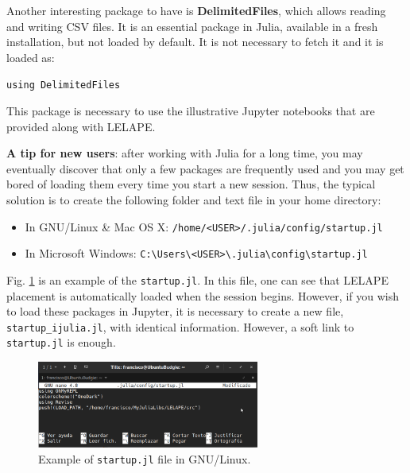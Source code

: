 Another interesting package to have is \textbf{DelimitedFiles}, which allows reading and writing CSV files. It is an essential package in Julia, available in a fresh installation, but not loaded by default. It is not necessary to fetch it and it is loaded as:
	
\vspace{1mm}
\begin{center}
	\texttt{using DelimitedFiles}
\end{center}
\vspace{1mm}	

This package is necessary to use the illustrative Jupyter notebooks that are provided along with LELAPE.

\textbf{A tip for new users}: after working with Julia for a long time, you may eventually discover that only a few packages are frequently used and  you may get bored of loading them every time you start a new session. Thus, the typical solution is to create the following folder and text file in your home directory:
%
\begin{itemize}
	\item In GNU/Linux \& Mac OS X: \texttt{/home/<USER>/.julia/config/startup.jl}
	\item In Microsoft Windows: \texttt{C:{\textbackslash}Users{\textbackslash}<USER>{\textbackslash}.julia{\textbackslash}config{\textbackslash}startup.jl}
\end{itemize}  
%
Fig. \ref{Fig:startup.jl} is an example of the \texttt{startup.jl}. In this file, one can see that LELAPE placement is automatically loaded when the session begins. However, if you wish to load these packages in Jupyter, it is necessary to create a new file, \texttt{startup\_ijulia.jl}, with identical information. However, a soft link to \texttt{startup.jl} is enough.
%
\begin{figure}
	\centering
	\includegraphics[width=0.65\textwidth]{fig/startup.jl}
	\caption{Example of \texttt{startup.jl} file in GNU/Linux.}
	\label{Fig:startup.jl}
\end{figure} 